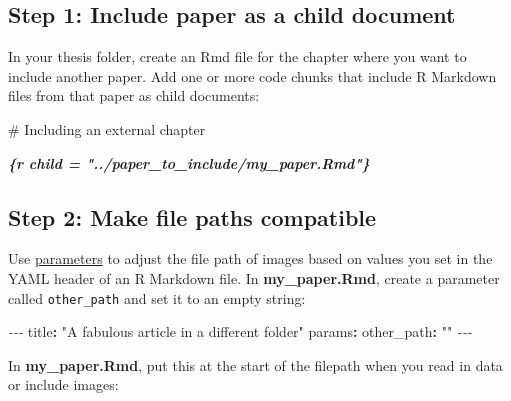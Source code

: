 \documentclass[a4paper, nobind]{templates/ociamthesis}
\newenvironment{Shaded}{\begin{snugshade}}{\end{snugshade}}
\newcommand{\AttributeTok}[1]{\textcolor[rgb]{0.77,0.63,0.00}{#1}}
\newcommand{\FunctionTok}[1]{\textcolor[rgb]{0.00,0.00,0.00}{#1}}
\newcommand{\InformationTok}[1]{\textcolor[rgb]{0.56,0.35,0.01}{\textbf{\textit{#1}}}}
\newcommand{\KeywordTok}[1]{\textcolor[rgb]{0.13,0.29,0.53}{\textbf{#1}}}
\newcommand{\NormalTok}[1]{#1}
\newcommand{\OtherTok}[1]{\textcolor[rgb]{0.56,0.35,0.01}{#1}}
\newcommand{\PreprocessorTok}[1]{\textcolor[rgb]{0.56,0.35,0.01}{\textit{#1}}}
\newcommand{\SpecialCharTok}[1]{\textcolor[rgb]{0.00,0.00,0.00}{#1}}
\newcommand{\StringTok}[1]{\textcolor[rgb]{0.31,0.60,0.02}{#1}}
\renewenvironment{Shaded}
{
  \vspace{10pt}%
  \begin{snugshade}%
}{%
  \end{snugshade}%
  \vspace{8pt}%
}
\begin{document}
\hypertarget{step-1-include-paper-as-a-child-document}{%
\subsection{Step 1: Include paper as a child document}\label{step-1-include-paper-as-a-child-document}}

In your thesis folder, create an Rmd file for the chapter where you want to include another paper.
Add one or more code chunks that include R Markdown files from that paper as child documents:

\begin{Shaded}
\begin{Highlighting}[]
\FunctionTok{\# Including an external chapter }

\InformationTok{\textasciigrave{}\textasciigrave{}\textasciigrave{}\{r child = "../paper\_to\_include/my\_paper.Rmd"\}}
\InformationTok{\textasciigrave{}\textasciigrave{}\textasciigrave{}}
\end{Highlighting}
\end{Shaded}

\hypertarget{step-2-make-file-paths-compatible}{%
\subsection{Step 2: Make file paths compatible}\label{step-2-make-file-paths-compatible}}

Use \href{https://rmarkdown.rstudio.com/lesson-6.html}{parameters} to adjust the file path of images based on values you set in the YAML header of an R Markdown file.
In \textbf{my\_paper.Rmd}, create a parameter called \texttt{other\_path} and set it to an empty string:

\begin{Shaded}
\begin{Highlighting}[]
\PreprocessorTok{{-}{-}{-}}
\FunctionTok{title}\KeywordTok{:}\AttributeTok{ }\StringTok{"A fabulous article in a different folder"}
\FunctionTok{params}\KeywordTok{:}
\AttributeTok{  }\FunctionTok{other\_path}\KeywordTok{:}\AttributeTok{ }\StringTok{""}
\PreprocessorTok{{-}{-}{-}}
\end{Highlighting}
\end{Shaded}

In \textbf{my\_paper.Rmd}, put this at the start of the filepath when you read in data or include images:

\begin{Shaded}
\end{Shaded}
\end{document}
